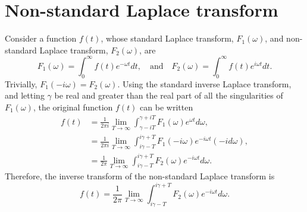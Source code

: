 \documentclass{aastex61}
\begin{document}
\appendix

\section{Non-standard Laplace transform}\label{app: laplace trans}
Consider a function $f(t)$, whose standard Laplace transform, $F_1(\omega)$, and non-standard Laplace transform, $F_2(\omega)$, are
\begin{equation}
F_1(\omega) = \int_0^\infty f(t) e^{-\omega t} dt,
\quad \text{and} \quad
F_2(\omega) = \int_0^\infty f(t) e^{i\omega t} dt.
\end{equation}
Trivially, $F_1(-i\omega) = F_2(\omega)$. Using the standard inverse Laplace transform, and letting $\gamma$ be real and greater than the real part of all the singularities of $F_1(\omega)$, the original function $f(t)$ can be written
\begin{align}
f(t) & = \frac{1}{2\pi i} \lim_{T\to\infty} \int_{\gamma - iT}^{\gamma + iT} F_1(\omega)e^{\omega t} d\omega, \\
& = \frac{1}{2\pi i} \lim_{T\to\infty} \int_{i\gamma - T}^{i\gamma + T} F_1(-i\omega)e^{-i\omega t} (-id\omega), \\
& = \frac{1}{2\pi} \lim_{T\to\infty} \int_{i\gamma - T}^{i\gamma + T} F_2(\omega)e^{-i\omega t} d\omega.
\end{align}
Therefore, the inverse transform of the non-standard Laplace transform is
\begin{equation}
f(t) = \frac{1}{2\pi} \lim_{T\to\infty} \int_{i\gamma - T}^{i\gamma + T} F_2(\omega)e^{-i\omega t} d\omega.
\end{equation}



\end{document}
